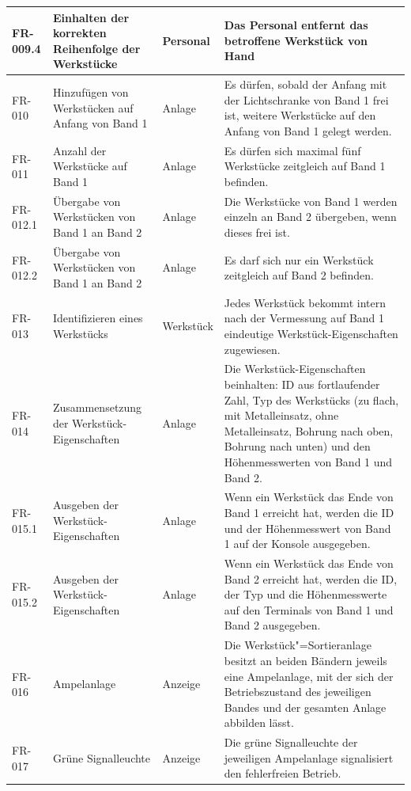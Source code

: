 \documentclass[oneside,a4paper,titlepage]{scrartcl} %
\begin{document}
\begin{small}
\begin{longtable}{|C{2cm}|L{4cm}|C{1.5cm}|L{5.5cm}|}
  \hline
  FR-009.4 & Einhalten der korrekten Reihenfolge der Werkstücke & Personal & Das Personal entfernt das betroffene Werkstück von Hand\\
  \hline
   FR-010 & Hinzufügen von Werkstücken auf Anfang von Band 1 & Anlage & Es dürfen, sobald der Anfang mit der Lichtschranke von Band 1 frei ist, weitere Werkstücke auf den Anfang von Band 1 gelegt werden.\\
  \hline
  FR-011 & Anzahl der Werkstücke auf Band 1 & Anlage & Es dürfen sich maximal fünf Werkstücke zeitgleich auf Band 1 befinden.\\
  \hline
   FR-012.1 & Übergabe von Werkstücken von Band 1 an Band 2 & Anlage & Die Werkstücke von Band 1 werden einzeln an Band 2 übergeben, wenn dieses frei ist.\\
  \hline
   FR-012.2 & Übergabe von Werkstücken von Band 1 an Band 2 & Anlage & Es darf sich nur ein Werkstück zeitgleich auf Band 2 befinden.\\
  \hline
  FR-013 & Identifizieren eines Werkstücks & Werkstück & Jedes Werkstück bekommt intern nach der Vermessung auf Band 1 eindeutige Werkstück-Eigenschaften zugewiesen.\\
  \hline
   FR-014 & Zusammensetzung der Werkstück-Eigenschaften & Anlage & Die Werkstück-Eigenschaften beinhalten: ID aus fortlaufender Zahl, Typ des Werkstücks (zu flach, mit Metalleinsatz, ohne Metalleinsatz, Bohrung nach oben, Bohrung nach unten) und den Höhenmesswerten von Band 1 und Band 2.\\
  \hline
  FR-015.1 & Ausgeben der Werkstück-Eigenschaften & Anlage & Wenn ein Werkstück das Ende von Band 1 erreicht hat, werden die ID und der Höhenmesswert von Band 1 auf der Konsole ausgegeben.\\
  \hline
  FR-015.2 & Ausgeben der Werkstück-Eigenschaften & Anlage & Wenn ein Werkstück das Ende von Band 2 erreicht hat, werden die ID, der Typ und die Höhenmesswerte auf den Terminals von Band 1 und Band 2 ausgegeben.\\
  \hline
   FR-016 & Ampelanlage & Anzeige & Die Werkstück"=Sortieranlage besitzt an beiden Bändern jeweils eine Ampelanlage, mit der sich der Betriebszustand des jeweiligen Bandes und der gesamten Anlage abbilden lässt.\\
  \hline
  FR-017 & Grüne Signalleuchte & Anzeige & Die grüne Signalleuchte der jeweiligen Ampelanlage signalisiert den fehlerfreien Betrieb.\\

\end{longtable}
\end{small}
\end{document}
